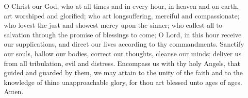 O Christ our God, who at all times and in every hour, in heaven and on earth, art worshiped and glorified; who art longsuffering, merciful and compassionate; who lovest the just and showest mercy upon the sinner; who callest all to salvation through the promise of blessings to come; O Lord, in this hour receive our supplications, and direct our lives according to thy commandments. Sanctify our souls, hallow our bodies, correct our thoughts, cleanse our minds; deliver us from all tribulation, evil and distress. Encompass us with thy holy Angels, that guided and guarded by them, we may attain to the unity of the faith and to the knowledge of thine unapproachable glory, for thou art blessed unto ages of ages. Amen.
